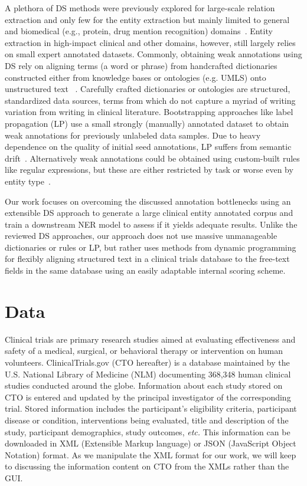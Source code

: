 \documentclass[letterpaper]{article} %
\begin{document}
A plethora of DS methods were previously explored for large-scale relation extraction and only few for the entity extraction but mainly limited to general and biomedical (e.g., protein, drug mention recognition) domains~\cite{etzioni2008open,smirnova2018relation,adelani2020distant}.
Entity extraction in high-impact clinical and other domains, however, still largely relies on small expert annotated datasets.
Commonly, obtaining weak annotations using DS rely on aligning terms (a word or phrase) from handcrafted dictionaries constructed either from knowledge bases or ontologies (e.g. UMLS) onto unstructured text ~\citep{giannakopoulos2017unsupervised,yang2018distantly, ghiasvand2018learning,peng2019distantly,hedderich2021anea}.
Carefully crafted dictionaries or ontologies are structured, standardized data sources, terms from which do not capture a myriad of writing variation from writing in clinical literature.
Bootstrapping approaches like label propagation (LP) use a small strongly (manually) annotated dataset to obtain weak annotations for previously unlabeled data samples\cite{bing2017bootstrapping}.
Due to heavy dependence on the quality of initial seed annotations, LP suffers from semantic drift~\cite{komachi2008graph,nagesh2018keep}.
Alternatively weak annotations could be obtained using custom-built rules like regular expressions, but these are either restricted by task or worse even by entity type~\cite{ratner2017snorkel,safranchik2020weakly,fries2021ontology}.

Our work focuses on overcoming the discussed annotation bottlenecks using an extensible DS approach to generate a large clinical entity annotated corpus and train a downstream NER model to assess if it yields adequate results.
Unlike the reviewed DS approaches, our approach does not use massive unmanageable dictionaries or rules or LP, but rather uses methods from dynamic programming for flexibly aligning structured text in a clinical trials database to the free-text fields in the same database using an easily adaptable internal scoring scheme.
%
\section{Data}
\label{sec:data}
%
Clinical trials are primary research studies aimed at evaluating effectiveness and safety of a medical, surgical, or behavioral therapy or intervention on human volunteers.
ClinicalTrials.gov (CTO hereafter) is a database maintained by the U.S. National Library of Medicine (NLM) documenting 368,348 human clinical studies conducted around the globe.
Information about each study stored on CTO is entered and updated by the principal investigator of the corresponding trial.
Stored information includes the participant's eligibility criteria, participant disease or condition, interventions being evaluated, title and description of the study, participant demographics, study outcomes, \textit{etc.}
This information can be downloaded in XML (Extensible Markup language) or JSON (JavaScript Object Notation) format.
As we manipulate the XML format for our work, we will keep to discussing the information content on CTO from the XMLs rather than the GUI.
\end{document}

